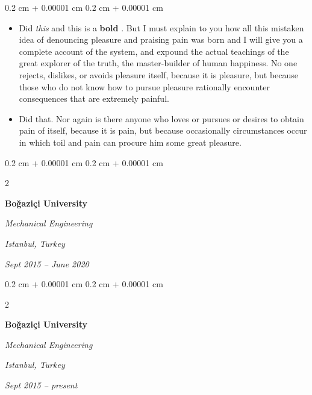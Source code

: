 \documentclass[10pt, letterpaper]{article}
\newenvironment{highlights}{
    \begin{itemize}[
        topsep=0.10 cm,
        parsep=0.10 cm,
        partopsep=0pt,
        itemsep=0pt,
        leftmargin=0.4 cm + 10pt
    ]
}{
    \end{itemize}
} %
\newenvironment{onecolentry}{
    \begin{adjustwidth}{
        0.2 cm + 0.00001 cm
    }{
        0.2 cm + 0.00001 cm
    }
}{
    \end{adjustwidth}
} %
\newenvironment{twocolentry}[2][]{
    \onecolentry
    \def\secondColumn{#2}
    \setcolumnwidth{\fill, 4.5 cm}
    \begin{paracol}{2}
}{
    \switchcolumn \raggedleft \secondColumn
    \end{paracol}
    \endonecolentry
} %
\let\hrefWithoutArrow\href
\renewcommand{\href}[2]{\hrefWithoutArrow{#1}{\ifthenelse{\equal{#2}{}}{ }{#2 }\raisebox{.15ex}{\footnotesize \faExternalLink*}}}
\begin{document}
        \vspace{0.10 cm}
        \begin{onecolentry}
            \begin{highlights}
                \item Did \textit{this} and this is a \textbf{bold} \href{https://example.com}{link}. But I must explain to you how all this mistaken idea of denouncing pleasure and praising pain was born and I will give you a complete account of the system, and expound the actual teachings of the great explorer of the truth, the master-builder of human happiness. No one rejects, dislikes, or avoids pleasure itself, because it is pleasure, but because those who do not know how to pursue pleasure rationally encounter consequences that are extremely painful.
                \item Did that. Nor again is there anyone who loves or pursues or desires to obtain pain of itself, because it is pain, but because occasionally circumstances occur in which toil and pain can procure him some great pleasure.
            \end{highlights}
        \end{onecolentry}


        \vspace{0.2 cm}

        \begin{twocolentry}{
        \textit{Istanbul, Turkey}    
            
        \textit{Sept 2015 – June 2020}}
            \textbf{Boğaziçi University}

            \textit{Mechanical Engineering}
        \end{twocolentry}



        \vspace{0.2 cm}

        \begin{twocolentry}{
        \textit{Istanbul, Turkey}    
            
        \textit{Sept 2015 – present}}
            \textbf{Boğaziçi University}

            \textit{Mechanical Engineering}
        \end{twocolentry}
\end{document}
